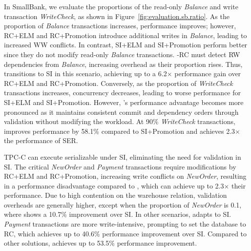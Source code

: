 In SmallBank, we evaluate the proportions of the read-only \textit{Balance} and write transaction \textit{WriteCheck}, as shown in Figure~\ref{fig:evaluation.sb.ratio}. 
As the proportion of \textit{Balance} transactions increases, performance improves; however, RC+ELM and RC+Promotion introduce additional writes in \textit{Balance}, leading to increased WW conflicts. In contrast, SI+ELM and SI+Promotion perform better since they do not modify read-only \textit{Balance} transactions.
\sysname-RC must detect RW dependencies from \textit{Balance}, increasing overhead as their proportion rises. Thus, \sysname transitions to SI in this scenario, achieving up to a 6.2$\times$ performance gain over RC+ELM and RC+Promotion. Conversely, as the proportion of \textit{WriteCheck} transactions increases, concurrency decreases, leading to worse performance for SI+ELM and SI+Promotion. However, \sysname's performance advantage becomes more pronounced as it maintains consistent commit and dependency orders through validation without modifying the workload. At 90\% \textit{WriteCheck} transactions, \sysname improves performance by 58.1\% compared to SI+Promotion and achieves 2.3$\times$ the performance of SER.

TPC-C can execute serializable under SI, eliminating the need for validation in SI. The critical \textit{NewOrder} and \textit{Payment} transactions require modifications by RC+ELM and RC+Promotion, increasing write conflicts on \textit{NewOrder}, resulting in a performance disadvantage compared to \sysname, which can achieve up to 2.3$\times$ their performance. Due to high contention on the warehouse relation, validation overheads are generally higher, except when the proportion of \textit{NewOrder} is 0.1, where \sysname shows a 10.7\% improvement over SI. In other scenarios, \sysname adapts to SI. \textit{Payment} transactions are more write-intensive, prompting \sysname to set the database to RC, which achieves up to 40.6\% performance improvement over SI. Compared to other solutions, \sysname achieves up to 53.5\% performance improvement.


